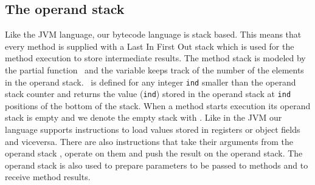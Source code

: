 \subsection{The operand stack}

Like the JVM language, our bytecode language is stack based. This means that every method is supplied with a Last In First Out
 stack which is used for the method execution to store intermediate results.
The method stack is modeled by the partial function \stackOnly \ and the variable
\counterOnly keeps track of the number of the elements in the operand stack. 
 \stackOnly \ is defined for any integer \texttt{ind} smaller than the operand stack counter \counterOnly 
 and returns the value \stackOnly(\texttt{ind})  stored in the operand stack at \texttt{ind}
 positions of the bottom of the stack. When a method starts execution its operand stack is empty and we denote the empty stack
 with \newStack. Like in the JVM our language supports instructions to load values stored in registers or object fields and viceversa.
 There are also instructions that take their arguments from the operand stack \stackOnly, operate on them and push the result on the operand
 stack. The operand stack is also used to prepare parameters to be passed to methods and to receive method results.   
